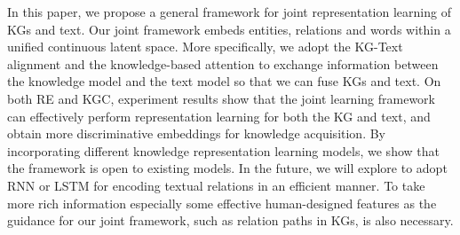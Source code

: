 \documentclass[letterpaper]{article} %
\begin{document}
In this paper, we propose a general framework for joint representation learning of KGs and text. Our joint framework embeds entities, relations and words within a unified continuous latent space. More specifically, we adopt the KG-Text alignment and the knowledge-based attention to exchange information between the knowledge model and the text model so that we can fuse KGs and text. On both RE and KGC, experiment results show that the joint learning framework can effectively perform representation learning for both the KG and text, and obtain more discriminative embeddings for knowledge acquisition. By incorporating different knowledge representation learning models, we show that the framework is open to existing models. In the future, we will explore to adopt RNN or LSTM for encoding textual relations in an efficient manner. To take more rich information especially some effective human-designed features as the guidance for our joint framework, such as relation paths in KGs, is also necessary.



\end{document}

